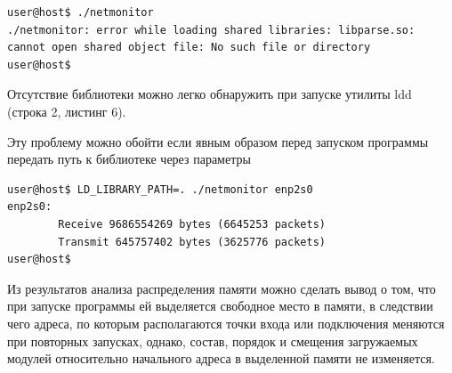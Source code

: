 \begin{Verbatim}[frame=single]
user@host$ ./netmonitor 
./netmonitor: error while loading shared libraries: libparse.so: cannot open shared object file: No such file or directory
user@host$
\end{Verbatim}

Отсутствие библиотеки можно легко обнаружить при запуске утилиты ldd (строка 2, листинг 6).



Эту проблему можно обойти если явным образом перед запуском программы передать путь к библиотеке через параметры

\begin{Verbatim}[frame=single]
user@host$ LD_LIBRARY_PATH=. ./netmonitor enp2s0
enp2s0:
        Receive 9686554269 bytes (6645253 packets)
        Transmit 645757402 bytes (3625776 packets)
user@host$
\end{Verbatim}

Из результатов анализа распределения памяти можно сделать вывод о том, что при запуске программы ей выделяется свободное место в памяти, в следствии чего адреса, по которым располагаются точки входа или подключения меняются при повторных запусках, однако, состав, порядок и смещения загружаемых модулей относительно начального адреса в выделенной памяти не изменяется.